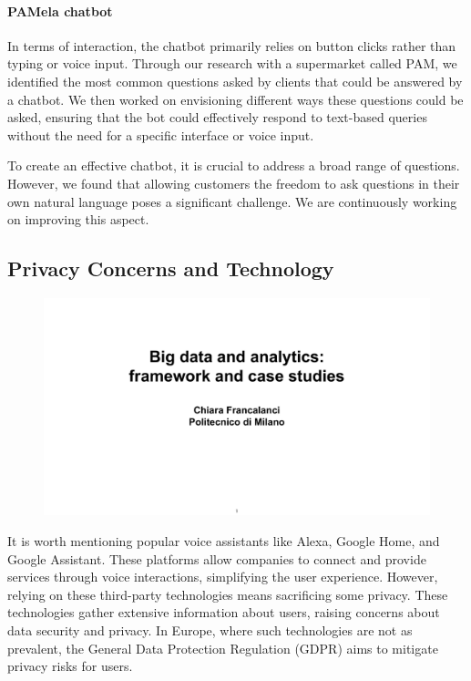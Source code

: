 \paragraph{PAMela chatbot}
In terms of interaction, the chatbot primarily relies on button clicks
rather than typing or voice input. Through our research with a
supermarket called PAM, we identified the most common questions asked by
clients that could be answered by a chatbot. We then worked on
envisioning different ways these questions could be asked, ensuring that
the bot could effectively respond to text-based queries without the need
for a specific interface or voice input.

To create an effective chatbot, it is crucial to address a broad range
of questions. However, we found that allowing customers the freedom to
ask questions in their own natural language poses a significant
challenge. We are continuously working on improving this aspect.

\subsection{Privacy Concerns and
  Technology}\label{privacy-concerns-and-technology}


\begin{figure}[!h]
  \centering
  \includegraphics[page=17, trim = 1.5cm 1cm 0.7cm 1cm, clip, width=\imagewidth]{images/06 - BIG_DATA.pdf}
\end{figure}

It is worth mentioning popular voice assistants like Alexa, Google Home,
and Google Assistant. These platforms allow companies to connect and
provide services through voice interactions, simplifying the user
experience. However, relying on these third-party technologies means
sacrificing some privacy. These technologies gather extensive
information about users, raising concerns about data security and
privacy. In Europe, where such technologies are not as prevalent, the
General Data Protection Regulation (GDPR) aims to mitigate privacy risks
for users.


